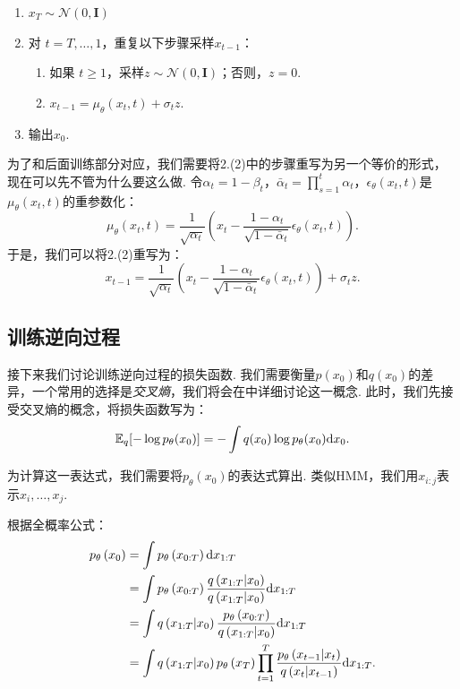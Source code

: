\begin{enumerate}
    \item $x_T \sim \mathcal{N}(0, \mathbf{I})$
    \item 对 $t = T, \ldots, 1$，重复以下步骤采样$x_{t-1}$：
    \begin{enumerate}
        \item 如果 $t\geq 1$，采样$z \sim \mathcal{N}(0, \mathbf{I})$；否则，$z = 0$.
        \item $x_{t-1} = \mu_\theta(x_t,t) + \sigma_t z$.
    \end{enumerate}
    \item 输出$x_0$.
\end{enumerate}

为了和后面训练部分对应，我们需要将2.(2)中的步骤重写为另一个等价的形式，现在可以先不管为什么要这么做. 令$\alpha_t=1-\beta_t$，$\bar\alpha_t=\prod_{s=1}^t\alpha_t$，$\epsilon_\theta(x_t, t)$是$\mu_\theta(x_t,t)$的重参数化：
\[
\mu_{\theta}(x_t, t) =  \frac{1}{\sqrt{\alpha_t}} \left( x_t - \frac{1-\alpha_t}{\sqrt{1 - \bar{\alpha}_t}}\epsilon_{\theta}(x_t, t) \right).
\]
于是，我们可以将2.(2)重写为：
\[x_{t-1} = \frac{1}{\sqrt{\alpha_t}} \left( x_t - \frac{1-\alpha_t}{\sqrt{1-\bar\alpha_t}} \epsilon_\theta(x_t, t) \right) + \sigma_t z.\]


\subsection{训练逆向过程}

接下来我们讨论训练逆向过程的损失函数. 我们需要衡量$p(x_0)$和$q(x_0)$的差异，一个常用的选择是\textit{交叉熵}，我们将会在中详细讨论这一概念. 此时，我们先接受交叉熵的概念，将损失函数写为：
\[
\mathbb{E}_q[-\log p_\theta(x_0)]=-\int q(x_0)\log p_\theta(x_0)\mathrm{d} x_0.
\]

为计算这一表达式，我们需要将$p_\theta(x_0)$的表达式算出. 类似HMM，我们用$x_{i:j}$表示$x_i,\dots,x_j$. 

根据全概率公式：
\[
    \begin{aligned}
        p_\theta\left(x_{0}\right)&=\int  p_\theta\left(x_{0:T}\right) \mathrm{d}  x_{1:T}\\
            &= \int p_\theta\left(x_{0:T}\right) \frac{q\left(x_{1:T} | x_{0}\right)}{q\left(x_{1:T} | x_{0}\right)} \mathrm{d}  x_{1:T} \\
        &= \int q\left(x_{1:T} | x_{0}\right) \frac{p_\theta\left(x_{0:T}\right)}{q\left(x_{1:T} | x_{0}\right)} \mathrm{d}  x_{1:T} \\
        &= \int q\left(x_{1:T} | x_{0}\right) p_\theta\left(x_{T}\right) \prod_{t=1}^T \frac{p_\theta\left(x_{t-1} | x_{t}\right)}{q\left(x_{t} | x_{t-1}\right)}\mathrm{d}  x_{1:T}.
    \end{aligned}    
\]

